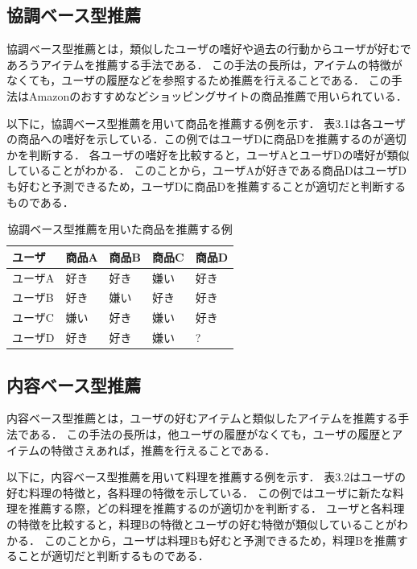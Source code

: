 \documentclass{funthesis}
\begin{document}
\subsection{協調ベース型推薦}
協調ベース型推薦とは，類似したユーザの嗜好や過去の行動からユーザが好むであろうアイテムを推薦する手法である．
この手法の長所は，アイテムの特徴がなくても，ユーザの履歴などを参照するため推薦を行えることである．
この手法はAmazon\cite{10}のおすすめなどショッピングサイトの商品推薦で用いられている．

以下に，協調ベース型推薦を用いて商品を推薦する例を示す．
表3.1は各ユーザの商品への嗜好を示している．この例ではユーザDに商品Dを推薦するのが適切かを判断する．
各ユーザの嗜好を比較すると，ユーザAとユーザDの嗜好が類似していることがわかる．
このことから，ユーザAが好きである商品DはユーザDも好むと予測できるため，ユーザDに商品Dを推薦することが適切だと判断するものである．

\begin{table}[htb]
  \begin{center}
  \scriptsize
    \caption{協調ベース型推薦を用いた商品を推薦する例}
    \normalsize
   \begin{tabular}{p{2.5cm}||p{2.5cm}|p{2.5cm}|p{2.5cm}|p{2.5cm}}
    \hline
ユーザ & 商品A & 商品B & 商品C & 商品D \\ \hline\hline
      ユーザA & 好き & 好き & 嫌い & 好き \\ \hline
      ユーザB & 好き & 嫌い & 好き & 好き \\ \hline
      ユーザC & 嫌い & 好き & 嫌い & 好き \\ \hline
      ユーザD & 好き & 好き & 嫌い & ? \\ \hline
  \end{tabular}
  \end{center}
\end{table}

\subsection{内容ベース型推薦}
内容ベース型推薦とは，ユーザの好むアイテムと類似したアイテムを推薦する手法である．
この手法の長所は，他ユーザの履歴がなくても，ユーザの履歴とアイテムの特徴さえあれば，推薦を行えることである．

以下に，内容ベース型推薦を用いて料理を推薦する例を示す．
表3.2はユーザの好む料理の特徴と，各料理の特徴を示している．
この例ではユーザに新たな料理を推薦する際，どの料理を推薦するのが適切かを判断する．
ユーザと各料理の特徴を比較すると，料理Bの特徴とユーザの好む特徴が類似していることがわかる．
このことから，ユーザは料理Bも好むと予測できるため，料理Bを推薦することが適切だと判断するものである．
\end{document}
